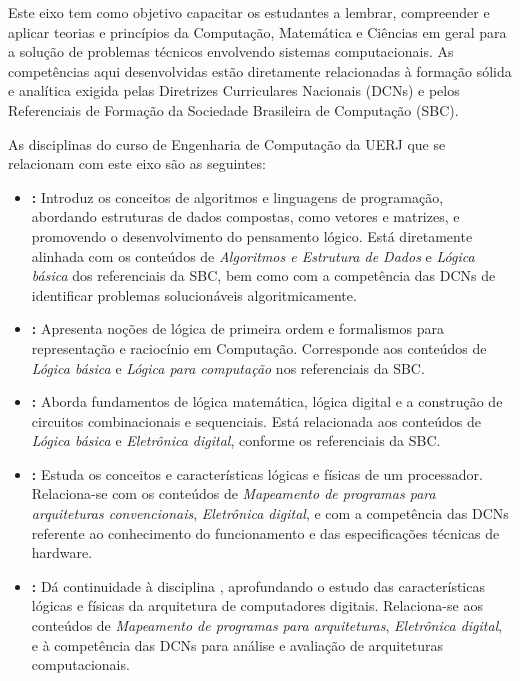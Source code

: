 Este eixo tem como objetivo capacitar os estudantes a lembrar, compreender e aplicar teorias e princípios da Computação, Matemática e Ciências em geral para a solução de problemas técnicos envolvendo sistemas computacionais. As competências aqui desenvolvidas estão diretamente relacionadas à formação sólida e analítica exigida pelas Diretrizes Curriculares Nacionais (DCNs) e pelos Referenciais de Formação da Sociedade Brasileira de Computação (SBC).

As disciplinas do curso de Engenharia de Computação da UERJ que se relacionam com este eixo são as seguintes:

\begin{itemize}
  \item \textbf{\AlgComp:} Introduz os conceitos de algoritmos e linguagens de programação, abordando estruturas de dados compostas, como vetores e matrizes, e promovendo o desenvolvimento do pensamento lógico. Está diretamente alinhada com os conteúdos de \textit{Algoritmos e Estrutura de Dados} e \textit{Lógica básica} dos referenciais da SBC, bem como com a competência das DCNs de identificar problemas solucionáveis algoritmicamente.

  \item \textbf{\LogProg:} Apresenta noções de lógica de primeira ordem e formalismos para representação e raciocínio em Computação. Corresponde aos conteúdos de \textit{Lógica básica} e \textit{Lógica para computação} nos referenciais da SBC.

  \item \textbf{\LogCircDig:} Aborda fundamentos de lógica matemática, lógica digital e a construção de circuitos combinacionais e sequenciais. Está relacionada aos conteúdos de \textit{Lógica básica} e \textit{Eletrônica digital}, conforme os referenciais da SBC.

  \item \textbf{\FundComp:} Estuda os conceitos e características lógicas e físicas de um processador. Relaciona-se com os conteúdos de \textit{Mapeamento de programas para arquiteturas convencionais}, \textit{Eletrônica digital}, e com a competência das DCNs referente ao conhecimento do funcionamento e das especificações técnicas de hardware.

  \item \textbf{\ArqComp:} Dá continuidade à disciplina \FundComp, aprofundando o estudo das características lógicas e físicas da arquitetura de computadores digitais. Relaciona-se aos conteúdos de \textit{Mapeamento de programas para arquiteturas}, \textit{Eletrônica digital}, e à competência das DCNs para análise e avaliação de arquiteturas computacionais.


\end{itemize}
